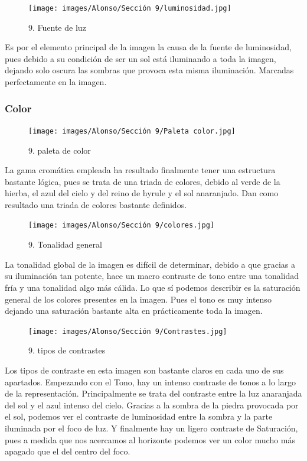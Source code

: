 \documentclass[12pt]{article}
\begin{document}
    \begin{figure}[H]
      \centering
      \texttt{[image: images/Alonso/Sección 9/luminosidad.jpg]}
      \caption{\small 9. Fuente de luz}
    \end{figure}

    Es por el elemento principal de la imagen la causa de la fuente de luminosidad, pues debido a su condición de ser un sol está iluminando a toda la imagen, dejando solo oscura las sombras que provoca esta misma iluminación. Marcadas perfectamente en la imagen.

        \subsubsection{Color}
        \begin{figure}[H]
      \centering
      \texttt{[image: images/Alonso/Sección 9/Paleta color.jpg]}
      \caption{\small 9. paleta de color}
    \end{figure}

        La gama cromática empleada ha resultado finalmente tener una estructura bastante lógica, pues se trata de una triada de colores, debido al verde de la hierba, el azul del cielo y del reino de hyrule y el sol anaranjado. Dan como resultado una triada de colores bastante definidos.
\begin{figure}[H]
      \centering
      \texttt{[image: images/Alonso/Sección 9/colores.jpg]}
      \caption{\small 9. Tonalidad general}
    \end{figure}
    La tonalidad global de la imagen es difícil de determinar, debido a que gracias a su iluminación tan potente, hace un macro contraste de tono entre una tonalidad fría y una tonalidad algo más cálida. Lo que sí podemos describir es la saturación general de los colores presentes en la imagen. Pues el tono es muy intenso dejando una saturación  bastante alta en prácticamente toda la imagen.

\begin{figure}[H]
      \centering
      \texttt{[image: images/Alonso/Sección 9/Contrastes.jpg]}
      \caption{\small 9. tipos de contrastes}
    \end{figure}
    Los tipos de contraste en esta imagen son bastante claros en cada uno de sus apartados. Empezando con el Tono, hay un intenso contraste de tonos a lo largo de la representación. Principalmente se trata del contraste entre la luz anaranjada del sol y el azul intenso del cielo. Gracias a la sombra de la piedra provocada por el sol, podemos ver el contraste de luminosidad entre la sombra y la parte iluminada por el foco de luz. Y finalmente hay un ligero contraste de Saturación, pues a medida que nos acercamos al horizonte podemos ver un color mucho más apagado que el del centro del foco.
\end{document}
